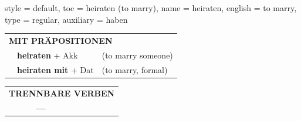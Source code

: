 \begin{verbentry}{
  style = {default},
  toc = {heiraten (to marry)},
  name = {heiraten},
  english = {to marry},
  type = {regular},
  auxiliary = {haben}
}
\vspace{10pt}

\begin{tabular}{lll}
\multicolumn{3}{l}{\textbf{MIT PRÄPOSITIONEN}}\\
& \textbf{heiraten} + Akk & (to marry someone)\\
& \textbf{heiraten mit} + Dat & (to marry, formal)\\
\end{tabular}
\hfill
\begin{tabular}{lll}
\multicolumn{3}{l}{\textbf{TRENNBARE VERBEN}}\\
& \textbf{---} & \\
\end{tabular}

\vspace{-5pt}
\end{verbentry}

